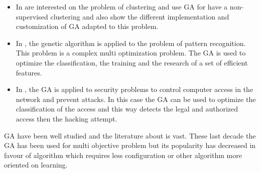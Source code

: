 
\begin{itemize}

\item In \cite{117*sheikh2008} are interested on the problem of clustering and use GA for have a non-supervised clustering and also show the different implementation and customization of GA adapted to this problem. 
\item In \cite{122*wang1996}, the genetic algorithm is applied to the problem of pattern recognition. This problem is a complex multi optimization problem. The GA is used to optimize the classification, the training and the research of a set of efficient features. 
\item In \cite{ 123*owais2008}, the GA is applied to security problems to control computer access in the network and prevent attacks. In this case the GA can be used to optimize the classification of the access and this way detects the legal and authorized access then the hacking attempt.   
 
\end{itemize}

GA have been well studied  and the literature about is vast. These last decade the GA  has been used for multi objective problem but  its popularity has decreased in favour of algorithm which requires less configuration or other algorithm  more oriented on learning.  
